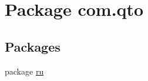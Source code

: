 \hypertarget{namespacecom_1_1qto}{}\section{Package com.\+qto}
\label{namespacecom_1_1qto}
\subsection*{Packages}
\begin{DoxyCompactItemize}
\item 
package \hyperlink{namespacecom_1_1qto_1_1ru}{ru}
\end{DoxyCompactItemize}
